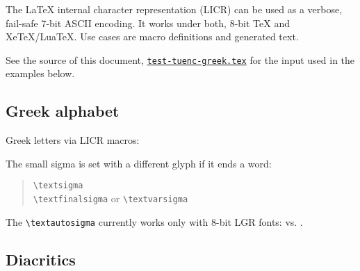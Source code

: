 \documentclass[a4paper]{scrartcl}
\begin{document}
The LaTeX internal character representation (LICR) can be used as a verbose,
fail-safe 7-bit ASCII encoding. It works under both, 8-bit
TeX and XeTeX/LuaTeX. Use cases are macro definitions and generated text.

See the source of this document,
\href{test-tuenc-greek.tex}{\texttt{test-tuenc-greek.tex}} for the input used
in the examples below.

\subsection{Greek alphabet}

Greek letters via LICR macros:
\begin{quote}
  \textAlpha{} \textBeta{} \textGamma{} \textDelta{} \textEpsilon{}
  \textZeta{} \textEta{} \textTheta{} \textIota{} \textKappa{}
  \textLambda{} \textMu{} \textNu{} \textXi{} \textOmicron{} \textPi{}
  \textRho{} \textSigma{} \textTau{} \textUpsilon{} \textPhi{}
  \textChi{} \textPsi{} \textOmega{}

  \textalpha{} \textbeta{} \textgamma{} \textdelta{} \textepsilon{}
  \textzeta{} \texteta{} \texttheta{} \textiota{} \textkappa{}
  \textlambda{} \textmu{} \textnu{} \textxi{} \textomicron{} \textpi{}
  \textrho{} \textsigma{} \texttau{} \textupsilon{}
  \textphi{} \textchi{} \textpsi{} \textomega{}
\end{quote}
The small sigma is set with a different
glyph if it ends a word:
\begin{quote}
  \textsigma{}       \verb|\textsigma|\\
  \textfinalsigma{}  \verb|\textfinalsigma| or \verb|\textvarsigma|
\end{quote}
The \verb|\textautosigma| currently works only with 8-bit LGR fonts:
\textautosigma\textiota{} vs. \textiota\textautosigma.


\subsection{Diacritics}
\end{document}

